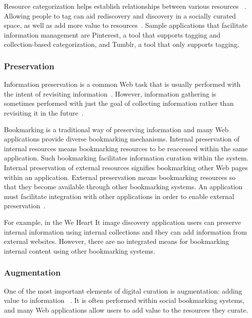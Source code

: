 \documentclass{sigchi}
\newcommand{\feature}[1]{{\ttfamily#1}}
\begin{document}
{{{Resource categorization helps establish relationships between various resources ~\cite{beagrie2008digital,whittaker2011personal}. Allowing people to tag can aid rediscovery and discovery in a socially curated space, as well as add more value to resources~\cite{gruber2007ontology}. Sample applications that facilitate information management are Pinterest, a tool that supports tagging and collection-based categorization, and Tumblr, a tool that only supports tagging.
} %

{\subsubsection{Preservation}
Information preservation is a common Web task that is usually performed with the intent of revisiting information~\cite{abrams1998information,whittaker2011personal}. However, information gathering is sometimes performed with just the goal of collecting information rather than revisiting it in the future~\cite{lindley2012s}. 

Bookmarking is a traditional way of preserving information and many Web applications provide diverse bookmarking mechanisms. \feature{Internal preservation of internal resources} means bookmarking resources to be reaccessed within the same application. Such bookmarking facilitates information curation within the system. \feature{Internal preservation of external resources} signifies bookmarking other Web pages within an application. \feature{External preservation} means bookmarking resources so that they become available through other bookmarking systems. An application must facilitate integration with other applications in order to enable external preservation~\cite{abrams1998information}.

For example, in the We Heart It image discovery application users can preserve \feature{internal  information} using \feature{internal collections} and they can add information from \feature{external} websites. However, there are no integrated means for bookmarking \feature{internal content} using other bookmarking systems.  
} %

{\subsubsection{Augmentation}
One of the most important elements of digital curation is augmentation: adding value to information ~\cite{beagrie2008digital,whittaker2011personal}. It is often performed within social bookmarking systems, and many Web applications allow users to add value to the resources they curate. 

}}}
\end{document}
